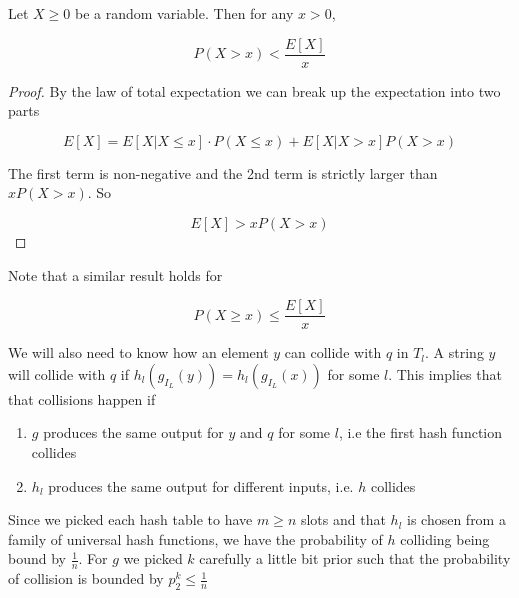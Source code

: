 \documentclass[../notes.tex]{subfiles}
\begin{document}
\begin{enumerate}
\begin{definition}
    Let $ X \ge 0 $ be a random variable. Then for any $ x > 0$,

    \begin{equation}
        P(X > x) < \frac{E[X]}{x}
    \end{equation}

    \begin{proof}

    By the law of total expectation we can break up the expectation into two parts

    \begin{equation}
        E[X] = E[X | X\le x] \cdot P(X \le x) + E[X | X > x] P(X>x)
    \end{equation}

    The first term is non-negative and the 2nd term is strictly larger than $ xP(X > x) $. So 

    \begin{equation}
        E[X] > x P (X > x)
    \end{equation}
    \end{proof}

    Note that a similar result holds for

    \begin{equation}
        P(X \ge x) \le  \frac{E[X]}{x}
    \end{equation}

\end{definition}


We will also need to know how an element $ y $ can collide with $ q $ in $ T_l $.
A string $ y $ will collide with $ q $ if $ h_l(g_{I_L}(y)) = h_l(g_{I_L}(x)) $ for some $ l $.
This implies that that collisions happen if

\begin{enumerate}
    \item $ g $ produces the same output for $ y $ and $ q $ for some $ l $, i.e the first hash function collides
    \item $ h_l $ produces the same output for different inputs, i.e. $ h $ collides
\end{enumerate}

Since we picked each hash table to have $ m \ge  n $ slots and that $ h_l $ is chosen from a family of universal hash functions, we have the probability of $ h $ colliding being bound by $ \frac{1}{n} $. 
For $ g $ we picked $ k $ carefully a little bit prior such that the probability of collision is bounded by $ p_2^k \le  \frac{1}{n}$


\end{enumerate}
\end{document}
